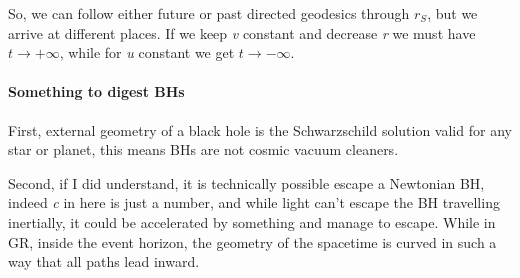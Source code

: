\bigskip

So, we can follow either future or past directed geodesics through $r_{S}$, but we arrive at different places. If we keep \emph{v} constant and decrease \emph{r} we must have $t \to + \infty$, while for \emph{u} constant we get $t \to  -\infty$.

\paragraph{Something to digest BHs} First, external geometry of a black hole is the Schwarzschild solution valid for any star or planet, this means BHs are not cosmic vacuum cleaners. \par
Second, if I did understand, it is technically possible escape a Newtonian BH, indeed \emph{c} in here is just a number, and while light can't escape the BH travelling inertially, it could be accelerated by something and manage to escape. While in GR, inside the event horizon, the geometry of the spacetime is curved in such a way that all paths lead inward. \par

